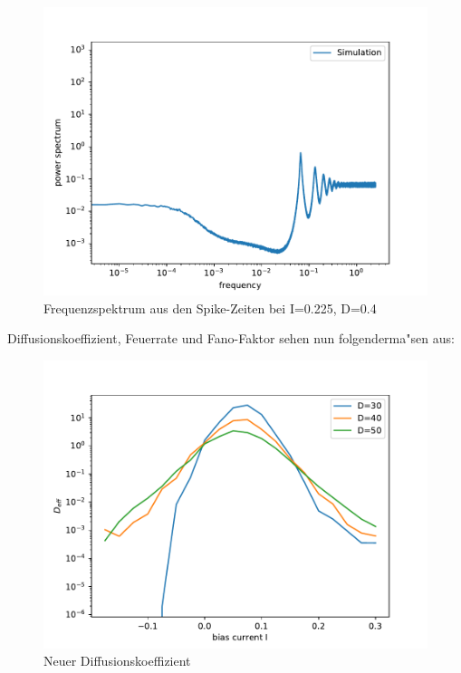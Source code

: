 \documentclass[12pt,a4paper]{article}
\begin{document}
\begin{figure}[H]
	\centering
	\includegraphics[scale=0.9]{inapikrealfast3jjem34017delta.pdf}
	\caption{Frequenzspektrum aus den Spike-Zeiten bei I=0.225, D=0.4}
	\label{sp4017delta}
\end{figure}
Diffusionskoeffizient, Feuerrate und Fano-Faktor sehen nun folgenderma"sen aus:
\begin{figure}[H]
	\centering
	\includegraphics[scale=0.9]{dneurrealfast3jjem3.pdf}
	\caption{Neuer Diffusionskoeffizient}
	\label{deff}
\end{figure}
\end{document}
